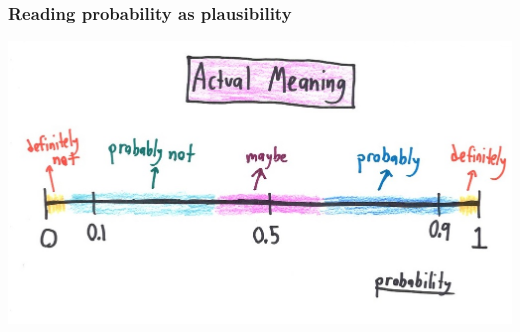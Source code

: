 \documentclass{beamer}
\begin{document}
\begin{frame}
  \frametitle{Reading probability as plausibility}
  \begin{center}
    \includegraphics[width = \textwidth,height = 0.8\textheight,keepaspectratio = true]{figure/probability}
  \end{center}

  \footnotesize{}
\end{frame} %
\end{document}
